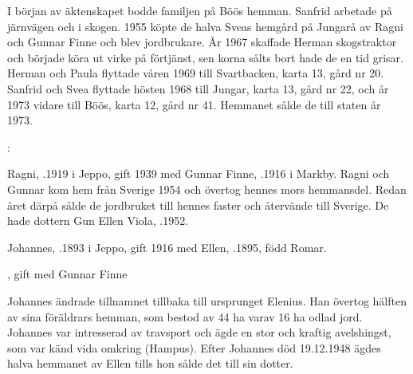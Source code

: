 I början av äktenskapet bodde familjen på Böös hemman. Sanfrid arbetade på järnvägen och i skogen. 1955 köpte de halva Sveas hemgård på Jungarå av Ragni och Gunnar Finne och blev jordbrukare. År 1967 skaffade Herman skogstraktor och började köra ut virke på förtjänst, sen korna sålts bort hade de en tid grisar. Herman och 	Paula flyttade våren 1969 till Svartbacken, karta 13, gård nr 20. Sanfrid och Svea flyttade hösten 1968 till Jungar, karta 13, gård nr 22, och år 1973 vidare till Böös, karta 12, gård nr 41. Hemmanet sålde de till staten år 1973.


%
:

Ragni, .1919 i Jeppo, gift 1939 med Gunnar Finne, .1916 i Markby. Ragni och Gunnar kom hem från Sverige 1954 och övertog hennes mors hemmansdel. Redan året därpå sålde de jordbruket till hennes faster och återvände till Sverige. De hade dottern Gun Ellen Viola, .1952.


%
Johannes, .1893 i Jeppo, gift 1916 med Ellen, .1895, född Romar.
\begin{jhchildren}
  \item {}
  \item {}, gift med Gunnar Finne
\end{jhchildren}
Johannes ändrade tillnamnet tillbaka till ursprunget Elenius. Han övertog hälften av sina föräldrars hemman, som bestod av 44 ha varav 16 ha odlad jord. Johannes var intresserad av travsport och ägde en stor och kraftig avelshingst, som var känd vida omkring (Hampus). Efter Johannes död 19.12.1948 ägdes halva hemmanet av Ellen tills hon sålde det till sin dotter.



